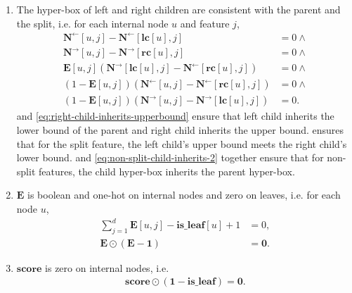 \begin{enumerate}
  \item The hyper-box of left and right children are consistent with the parent and the split, i.e. for each internal node $u$ and feature $j$,
    \begin{align}
    \mathbf{N}^{\leftarrow}[u, j] - \mathbf{N}^{\leftarrow}[\mathbf{lc}[u], j] &= 0\land\label{eq:left-child-inherits-lowerbound}\\
    \mathbf{N}^{\rightarrow}[u, j] - \mathbf{N}^{\rightarrow}[\mathbf{rc}[u], j] &= 0\land\label{eq:right-child-inherits-upperbound}\\
    \mathbf{E}[u, j](\mathbf{N}^{\rightarrow}[\mathbf{lc}[u], j] - \mathbf{N}^{\leftarrow}[\mathbf{rc}[u], j]) &= 0\land\label{eq:split-child-consistency}\\
    (1-\mathbf{E}[u, j])(\mathbf{N}^{\leftarrow}[u, j] - \mathbf{N}^{\leftarrow}[\mathbf{rc}[u], j]) &= 0\land\label{eq:non-split-child-inherits-1}\\
    (1-\mathbf{E}[u, j])(\mathbf{N}^{\rightarrow}[u, j] - \mathbf{N}^{\rightarrow}[\mathbf{lc}[u], j]) &= 0.\label{eq:non-split-child-inherits-2}
    \end{align}
     and \ref{eq:right-child-inherits-upperbound} ensure that 
    left child inherits the lower bound of the parent and right child inherits the upper bound.
     ensures that for the split feature, 
    the left child's upper bound meets the right child's lower bound.
     and \ref{eq:non-split-child-inherits-2} together ensure that 
    for non-split features, the child hyper-box inherits the parent hyper-box.

  \item $\mathbf{E}$ is boolean and one-hot on internal nodes and zero on leaves, i.e. for each node $u$,
    \begin{align}
    \sum_{j=1}^d \mathbf{E}[u, j] - \mathbf{is\_leaf}[u] + 1 &= 0,\\
    \mathbf{E}\odot(\mathbf{E}-\mathbf{1}) &= \mathbf{0}.
    \end{align}

  \item $\mathbf{score}$ is zero on internal nodes, i.e.
    \begin{align}
    \mathbf{score}\odot (\mathbf{1}-\mathbf{is\_leaf}) = \mathbf{0}.
    \end{align}
  \end{enumerate}

